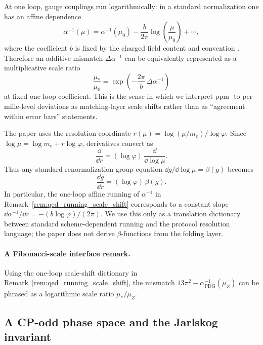 \begin{remark}\label{rem:qed_running_scale_shift}
At one loop, gauge couplings run logarithmically: in a standard normalization one has an affine dependence
\[
\alpha^{-1}(\mu)=\alpha^{-1}(\mu_0)-\frac{b}{2\pi}\log\!\left(\frac{\mu}{\mu_0}\right)+\cdots,
\]
where the coefficient $b$ is fixed by the charged field content and convention \cite{PeskinSchroeder1995,WeinbergQFT1995}.
Therefore an additive mismatch $\Delta\alpha^{-1}$ can be equivalently represented as a multiplicative scale ratio
\[
\frac{\mu_\ast}{\mu_0}=\exp\!\left(-\frac{2\pi}{b}\,\Delta\alpha^{-1}\right)
\]
at fixed one-loop coefficient.
This is the sense in which we interpret ppm- to per-mille-level deviations as matching-layer scale shifts rather than as ``agreement within error bars'' statements.
\end{remark}

\begin{remark}\label{rem:rg_in_r_coordinate}
The paper uses the resolution coordinate $r(\mu)=\log(\mu/m_e)/\log\varphi$.
Since $\log\mu=\log m_e + r\log\varphi$, derivatives convert as
\[
\frac{\dd}{\dd r}=(\log\varphi)\,\frac{\dd}{\dd\log\mu}.
\]
Thus any standard renormalization-group equation $\dd g/\dd\log\mu=\beta(g)$ becomes
\[
\frac{\dd g}{\dd r}=(\log\varphi)\,\beta(g).
\]
In particular, the one-loop affine running of $\alpha^{-1}$ in Remark~\ref{rem:qed_running_scale_shift} corresponds to a constant slope $\dd \alpha^{-1}/\dd r=-(b\log\varphi)/(2\pi)$.
We use this only as a translation dictionary between standard scheme-dependent running and the protocol resolution language; the paper does not derive $\beta$-functions from the folding layer.
\end{remark}

\paragraph{A Fibonacci-scale interface remark.}
Using the one-loop scale-shift dictionary in Remark~\ref{rem:qed_running_scale_shift}, the mismatch $13\pi^2-\alpha^{-1}_{\mathrm{PDG}}(\mu_Z)$ can be phrased as a logarithmic scale ratio $\mu_\ast/\mu_Z$.

\subsection{A CP-odd phase space and the Jarlskog invariant}
\label{subsec:cp_jarlskog}

